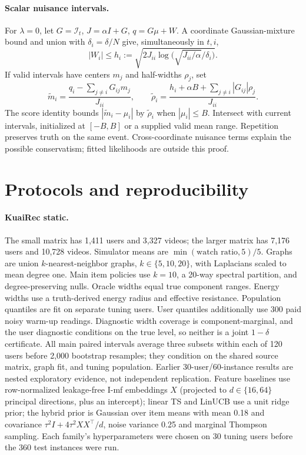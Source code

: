 \documentclass[sigconf,review,anonymous]{acmart}
\newcommand{\I}{\mathcal{I}}
\begin{document}
\paragraph{Scalar nuisance intervals.}
For $\lambda=0$, let $G=\I_t$, $J=\alpha I+G$, $q=G\mu+W$. A coordinate Gaussian-mixture bound and union with $\delta_i=\delta/N$ give, simultaneously in $t,i$,
\[
|W_i|\le h_i:=\sqrt{2J_{ii}\log\big(\sqrt{J_{ii}/\alpha}/\delta_i\big)}.
\]
If valid intervals have centers $m_j$ and half-widths $\rho_j$, set
\[
\widetilde m_i=\frac{q_i-\sum_{j\ne i}G_{ij}m_j}{J_{ii}},\qquad
\widetilde\rho_i=\frac{h_i+\alpha B+\sum_{j\ne i}|G_{ij}|\rho_j}{J_{ii}}.
\]
The score identity bounds $|\widetilde m_i-\mu_i|$ by $\widetilde\rho_i$ when $|\mu_i|\le B$. Intersect with current intervals, initialized at $[-B,B]$ or a supplied valid mean range. Repetition preserves truth on the same event. Cross-coordinate nuisance terms explain the possible conservatism; fitted likelihoods are outside this proof.

\section{Protocols and reproducibility}\label{app:data}

\paragraph{KuaiRec static.} The small matrix has 1,411 users and 3,327 videos; the larger matrix has 7,176 users and 10,728 videos. Simulator means are $\min(\text{watch ratio},5)/5$. Graphs are union $k$-nearest-neighbor graphs, $k\in\{5,10,20\}$, with Laplacians scaled to mean degree one. Main item policies use $k=10$, a 20-way spectral partition, and degree-preserving nulls. Oracle widths equal true component ranges. Energy widths use a truth-derived energy radius and effective resistance. Population quantiles are fit on separate tuning users. User quantiles additionally use 300 paid noisy warm-up readings. Diagnostic width coverage is component-marginal, and the user diagnostic conditions on the true level, so neither is a joint $1-\delta$ certificate. All main paired intervals average three subsets within each of 120 users before 2,000 bootstrap resamples; they condition on the shared source matrix, graph fit, and tuning population. Earlier 30-user/60-instance results are nested exploratory evidence, not independent replication. Feature baselines use row-normalized leakage-free I-mf embeddings $X$ (projected to $d\in\{16,64\}$ principal directions, plus an intercept); linear TS and LinUCB use a unit ridge prior; the hybrid prior is Gaussian over item means with mean 0.18 and covariance $\tau^2I+4\tau^2XX^\top/d$, noise variance 0.25 and marginal Thompson sampling. Each family's hyperparameters were chosen on 30 tuning users before the 360 test instances were run.
\end{document}
